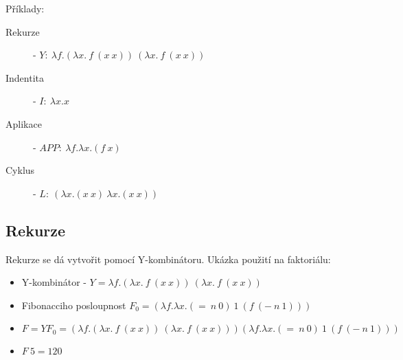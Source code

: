\documentclass{szzclass}
\begin{document}
Příklady:
\begin{description}
\item[Rekurze] - $Y:~\lambda f.(\lambda x.~f~(x~x))~(\lambda x.~f~(x~x))$
\item[Indentita] - $I:~\lambda x.x$
\item[Aplikace] - $APP:~\lambda f.\lambda x.(f~x)$
\item[Cyklus] - $L:~(\lambda x.(x~x)~\lambda x.(x~x))$
\end{description}

\subsection{Rekurze}
Rekurze se dá vytvořit pomocí Y-kombinátoru. Ukázka použití na faktoriálu:
\begin{itemize}
\item Y-kombinátor - $Y=\lambda f.(\lambda x.~f~(x~x))~(\lambda x.~f~(x~x))$
\item Fibonacciho posloupnost $F_0=(\lambda f.\lambda x.(=~n~0)~1~(f~(-~n~1)))$
\item $F = Y F_0 = (\lambda f.(\lambda x.~f~(x~x))~(\lambda x.~f~(x~x))) (\lambda f.\lambda x.(=~n~0)~1~(f~(-~n~1)))$
\item $F~5 = 120$
\end{itemize}
\end{document}
